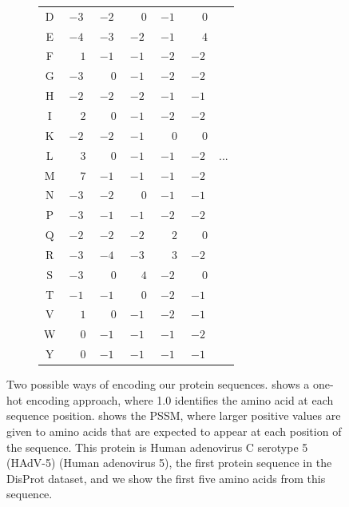 \documentclass{l4proj}
\begin{document}
\begin{figure}
\begin{subfigure}[h]{0.45\textwidth}
\begin{tabular}{|c|cccccc|}
        D & $-3$ & $-2$ & $\phantom{-}0$ & $-1$ & $\phantom{-}0$ & \\
        E & $-4$ & $-3$ & $-2$ & $-1$ & $\phantom{-}4$ & \\
        F & $\phantom{-}1$ & $-1$ & $-1$ & $-2$ & $-2$ & \\
        G & $-3$ & $\phantom{-}0$ & $-1$ & $-2$ & $-2$ & \\
        H & $-2$ & $-2$ & $-2$ & $-1$ & $-1$ & \\
        I & $\phantom{-}2$ & $\phantom{-}0$ & $-1$ & $-2$ & $-2$ & \\
        K & $-2$ & $-2$ & $-1$ & $\phantom{-}0$ & $\phantom{-}0$ & \\
        L & $\phantom{-}3$ & $\phantom{-}0$ & $-1$ & $-1$ & $-2$ & ... \\
        M & $\phantom{-}7$ & $-1$ & $-1$ & $-1$ & $-2$ & \\
        N & $-3$ & $-2$ & $\phantom{-}0$ & $-1$ & $-1$ & \\
        P & $-3$ & $-1$ & $-1$ & $-2$ & $-2$ & \\
        Q & $-2$ & $-2$ & $-2$ & $\phantom{-}2$ & $\phantom{-}0$ & \\
        R & $-3$ & $-4$ & $-3$ & $\phantom{-}3$ & $-2$ & \\
        S & $-3$ & $\phantom{-}0$ & $\phantom{-}4$ & $-2$ & $\phantom{-}0$ & \\
        T & $-1$ & $-1$ & $\phantom{-}0$ & $-2$ & $-1$ & \\
        V & $\phantom{-}1$ & $\phantom{-}0$ & $-1$ & $-2$ & $-1$ & \\
        W & $\phantom{-}0$ & $-1$ & $-1$ & $-1$ & $-2$ & \\
        Y & $\phantom{-}0$ & $-1$ & $-1$ & $-1$ & $-1$ & \\ \hline
        \end{tabular}
    \end{subfigure}
    \caption{Two possible ways of encoding our protein sequences.  shows a one-hot encoding approach, where 1.0 identifies the amino acid at each sequence position.  shows the PSSM, where larger positive values are given to amino acids that are expected to appear at each position of the sequence. This protein is Human adenovirus C serotype 5 (HAdV-5) (Human adenovirus 5), the first protein sequence in the DisProt dataset, and we show the first five amino acids from this sequence.
    }\label{fig:feature encoding}
\end{figure}
\end{document}
